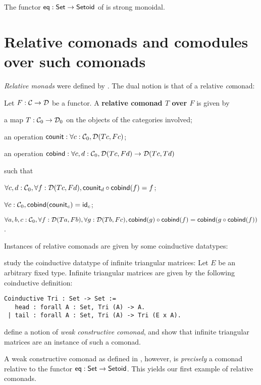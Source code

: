 \documentclass{amsart}
\newcommand{\fat}[1]{\textbf{#1}}
\begin{document}
\begin{example}
  The functor $\eq: \Set \to \Setoid$ of  is strong monoidal.
\end{example}


\section{Relative comonads and comodules over such comonads}\label{sec:comonads}

\emph{Relative monads} were defined by \textcite{DBLP:conf/fossacs/AltenkirchCU10}.
The dual notion is that of a relative \emph{co}monad:

\begin{definition}\label{def:rel_comonad}
  Let $F:\C\to\D$ be a functor. A \fat{relative comonad $T$ over $F$} is given by
  \begin{packitem}
   \item a map $T:\C_0 \to \D_0$ on the objects of the categories involved;
   \item an operation $\counit : \forall c : \C_0, \D(Tc,Fc)$;
   \item an operation $\cobind: \forall c,d:\C_0, \D(Tc,Fd) \to \D(Tc,Td)$
  \end{packitem}
  such that 
  \begin{packitem}
   \item $\forall c,d:\C_0, \forall f:\D(Tc,Fd), \comp{\cobind(f)}{\counit_d} = f$;
   \item $\forall c : \C_0, \cobind(\counit_c) = \id_c$;
   \item $\forall a,b,c:\C_0, \forall f : \D(Ta,Fb),\forall g:\D(Tb,Fc), \\
        \comp{\cobind(f)}{\cobind(g)} = \cobind(\comp{\cobind(f)}{g})$.
  \end{packitem} 
\end{definition}

Instances of relative comonads are given by some coinductive datatypes:


\begin{example}\label{ex:tri_comonad}
  \textcite{DBLP:conf/types/MatthesP11} study the coinductive datatype of infinite triangular matrices:
Let $E$ be an arbitrary fixed type.
   Infinite triangular matrices are given by the following coinductive definition: 
  \begin{lstlisting}
Coinductive Tri : Set -> Set :=
   head : forall A : Set, Tri (A) -> A.
 | tail : forall A : Set, Tri (A) -> Tri (E x A).
  \end{lstlisting}
%
  \textcite{DBLP:conf/types/MatthesP11} define a notion of \emph{weak constructive comonad}, and show that infinite triangular matrices
  are an instance of such a comonad.
   
  A weak constructive comonad as defined in \parencite{DBLP:conf/types/MatthesP11}, however, is \emph{precisely}
  a comonad relative to the functor $\eq : \Set\to\Setoid$.
  This yields our first example of relative comonads. 
\end{example}
\end{document}
